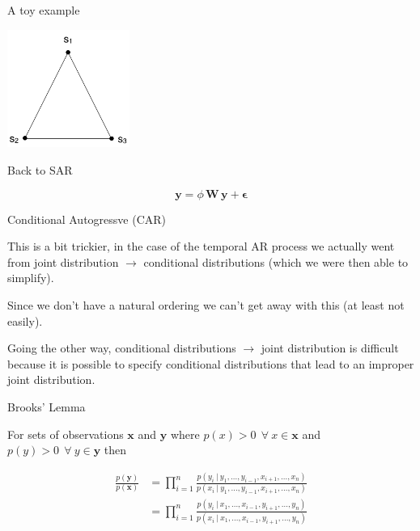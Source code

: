 \documentclass[11pt,ignorenonframetext,]{beamer}
\begin{document}
\begin{frame}[t]{A toy example}
\protect\hypertarget{a-toy-example}{}

\begin{center}
\includegraphics[width=0.3\textwidth]{figs/triangle_adj.png} \\
\end{center}

\end{frame}

\begin{frame}[t]{Back to SAR}
\protect\hypertarget{back-to-sar}{}

\[ \symbf{y} = \phi \, \symbf{W} \, \symbf{y} + \symbf{\epsilon} \]

\end{frame}

\begin{frame}[t]{Conditional Autogressve (CAR)}
\protect\hypertarget{conditional-autogressve-car}{}

This is a bit trickier, in the case of the temporal AR process we
actually went from joint distribution \(\to\) conditional distributions
(which we were then able to simplify).

\vspace{3mm}

Since we don't have a natural ordering we can't get away with this (at
least not easily).

\vspace{3mm}

Going the other way, conditional distributions \(\to\) joint
distribution is difficult because it is possible to specify conditional
distributions that lead to an improper joint distribution.

\end{frame}

\begin{frame}[t]{Brooks' Lemma}
\protect\hypertarget{brooks-lemma}{}

For sets of observations \(\symbf{x}\) and \(\symbf{y}\) where
\(p(x) > 0~~\forall ~ x\in\symbf{x}\) and
\(p(y) > 0~~\forall ~ y\in\symbf{y}\) then

\[\begin{aligned}
\frac{p(\symbf{y})}{p(\symbf{x})} 
  &= \prod_{i=1}^n \frac{p(y_i ~|~ y_1,\ldots,y_{i-1},x_{i+1},\ldots,x_n)}{p(x_i ~|~ y_1,\ldots,y_{i-1},x_{i+1},\ldots,x_n)} \\
  &= \prod_{i=1}^n \frac{p(y_i ~|~ x_1,\ldots,x_{i-1},y_{i+1},\ldots,y_n)}{p(x_i ~|~ x_1,\ldots,x_{i-1},y_{i+1},\ldots,y_n)} \\
\end{aligned}\]

\end{frame}
\end{document}
